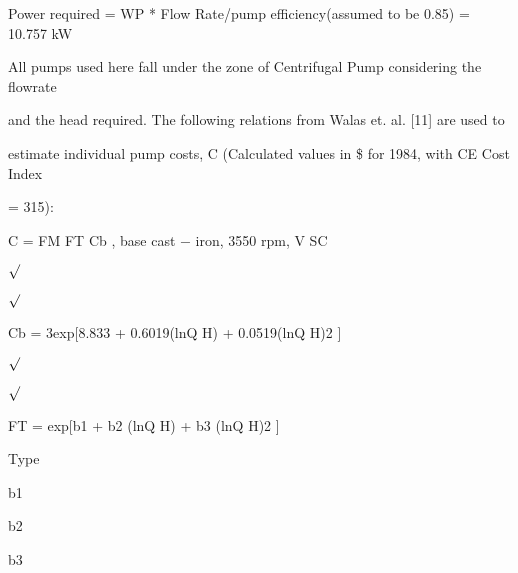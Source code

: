 \documentclass[a4paper,portrait,12pt]{article}
\begin{document}
\begin{flushleft}
Power required = WP * Flow Rate/pump efficiency(assumed to be 0.85) = 10.757 kW
\end{flushleft}


\begin{flushleft}
All pumps used here fall under the zone of Centrifugal Pump considering the flowrate
\end{flushleft}


\begin{flushleft}
and the head required. The following relations from Walas et. al. [11] are used to
\end{flushleft}


\begin{flushleft}
estimate individual pump costs, C (Calculated values in \$ for 1984, with CE Cost Index
\end{flushleft}


= 315):


\begin{flushleft}
C = FM FT Cb , base cast $-$ iron, 3550 rpm, V SC
\end{flushleft}


$\surd$


$\surd$


\begin{flushleft}
Cb = 3exp[8.833 + 0.6019(lnQ H) + 0.0519(lnQ H)2 ]
\end{flushleft}


$\surd$


$\surd$


\begin{flushleft}
FT = exp[b1 + b2 (lnQ H) + b3 (lnQ H)2 ]
\end{flushleft}


\begin{flushleft}
Type
\end{flushleft}





\begin{flushleft}
b1
\end{flushleft}





\begin{flushleft}
b2
\end{flushleft}





\begin{flushleft}
b3
\end{flushleft}
\end{document}
